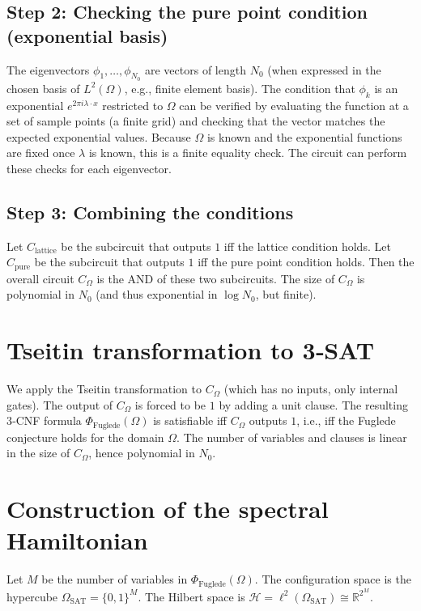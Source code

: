\documentclass[11pt,a4paper]{article}
\begin{document}
\subsection{Step 2: Checking the pure point condition (exponential basis)}

The eigenvectors $\phi_1,\dots,\phi_{N_0}$ are vectors of length $N_0$ (when expressed in the chosen basis of $L^2(\Omega)$, e.g., finite element basis). The condition that $\phi_k$ is an exponential $e^{2\pi i \lambda \cdot x}$ restricted to $\Omega$ can be verified by evaluating the function at a set of sample points (a finite grid) and checking that the vector matches the expected exponential values. Because $\Omega$ is known and the exponential functions are fixed once $\lambda$ is known, this is a finite equality check. The circuit can perform these checks for each eigenvector.

\subsection{Step 3: Combining the conditions}

Let $C_{\text{lattice}}$ be the subcircuit that outputs $1$ iff the lattice condition holds. Let $C_{\text{pure}}$ be the subcircuit that outputs $1$ iff the pure point condition holds. Then the overall circuit $C_{\Omega}$ is the AND of these two subcircuits. The size of $C_{\Omega}$ is polynomial in $N_0$ (and thus exponential in $\log N_0$, but finite).

\section{Tseitin transformation to 3‑SAT}

We apply the Tseitin transformation to $C_{\Omega}$ (which has no inputs, only internal gates). The output of $C_{\Omega}$ is forced to be $1$ by adding a unit clause. The resulting 3‑CNF formula $\Phi_{\text{Fuglede}}(\Omega)$ is satisfiable iff $C_{\Omega}$ outputs $1$, i.e., iff the Fuglede conjecture holds for the domain $\Omega$. The number of variables and clauses is linear in the size of $C_{\Omega}$, hence polynomial in $N_0$.

\section{Construction of the spectral Hamiltonian}

Let $M$ be the number of variables in $\Phi_{\text{Fuglede}}(\Omega)$. The configuration space is the hypercube $\Omega_{\text{SAT}} = \{0,1\}^M$. The Hilbert space is $\mathcal{H} = \ell^2(\Omega_{\text{SAT}}) \cong \mathbb{R}^{2^M}$.
\end{document}
